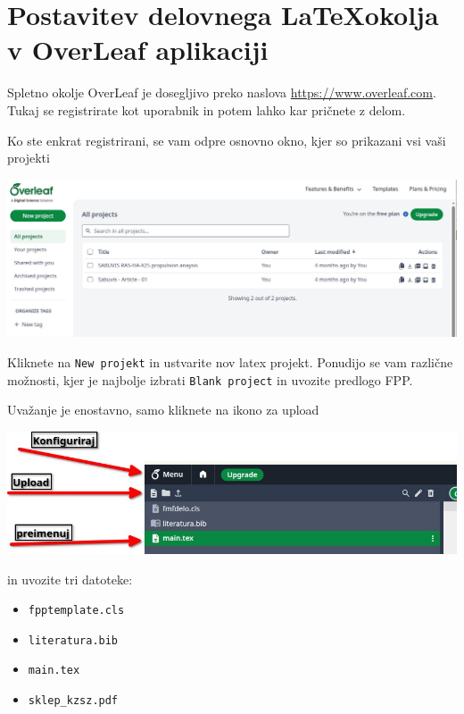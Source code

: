 \documentclass[12pt]{article}
\theoremstyle{definition}
\begin{document}
\newpage
\section{Postavitev delovnega \LaTeX okolja v OverLeaf aplikaciji}
\label{sec:Overleaf}

Spletno okolje OverLeaf je dosegljivo preko naslova \url{https://www.overleaf.com}. Tukaj se registrirate kot uporabnik in potem lahko kar pričnete z delom.

Ko ste enkrat registrirani, se vam odpre osnovno okno, kjer so prikazani vsi vaši projekti

\vspace*{5mm}
\begin{center}
	\includegraphics[width=\linewidth]{figs/overleaf_01.jpg}
\end{center}
\vspace*{5mm}

Kliknete na \texttt{New projekt} in ustvarite nov latex projekt. Ponudijo se vam različne možnosti, kjer je najbolje izbrati \texttt{Blank project} in uvozite predlogo FPP.

Uvažanje je enostavno, samo kliknete na ikono za upload

\vspace*{5mm}
\begin{center}
	\includegraphics[width=0.6\linewidth]{figs/overleaf_02.jpg}
\end{center}
\vspace*{5mm}

in uvozite tri datoteke:

\begin{itemize}[nosep]
	\item \texttt{fpptemplate.cls}
	\item \texttt{literatura.bib}
	\item \texttt{main.tex}
	\item \texttt{sklep\_kzsz.pdf}
\end{itemize}
\end{document}
